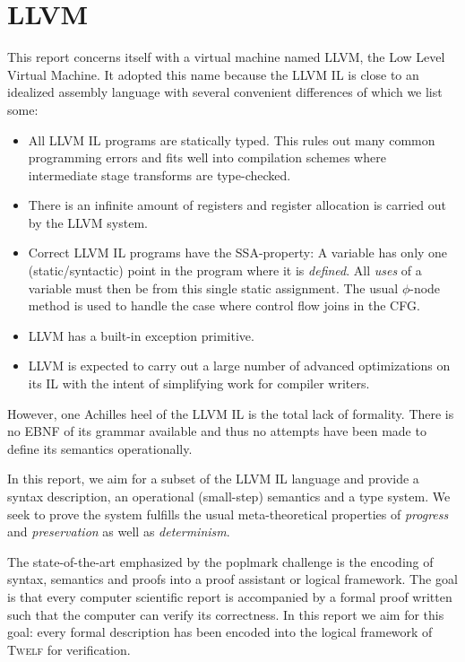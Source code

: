 \documentclass[a4paper, oneside, 10pt, draft]{memoir}
\newcommand{\twelf}{\textsc{Twelf}}
\begin{document}
\section{LLVM}

This report concerns itself with a virtual machine named LLVM, the Low
Level Virtual Machine. It adopted this name because the LLVM IL is
close to an idealized assembly language with several convenient
differences of which we list some:
\begin{itemize}
\item All LLVM IL programs are statically typed. This rules out many
  common programming errors and fits well into compilation schemes
  where intermediate stage transforms are type-checked.
\item There is an infinite amount of registers and register allocation
  is carried out by the LLVM system.
\item Correct LLVM IL programs have the SSA-property: A variable has
  only one (static/syntactic) point in the program where it is
  \emph{defined}. All \emph{uses} of a variable must then be from this
  single static assignment. The usual $\phi$-node method is used to
  handle the case where control flow joins in the CFG.
\item LLVM has a built-in exception primitive.
\item LLVM is expected to carry out a large number of advanced
  optimizations on its IL with the intent of simplifying work for
  compiler writers.
\end{itemize}

However, one Achilles heel of the LLVM IL is the total lack of
formality. There is no EBNF of its grammar available and thus no
attempts have been made to define its semantics operationally.

In this report, we aim for a subset of the LLVM IL language and
provide a syntax description, an operational (small-step) semantics and a type
system. We seek to prove the system fulfills the usual meta-theoretical
properties of \emph{progress} and \emph{preservation} as well as
\emph{determinism}.

The state-of-the-art emphasized by the poplmark
challenge\cite{aydemir:2005:mechanizedmetatheory} is the encoding of
syntax, semantics and proofs into a proof assistant or logical
framework. The goal is that every computer scientific report is
accompanied by a formal proof written such that the computer can
verify its correctness. In this report we aim for this goal: every
formal description has been encoded into the logical framework of
\twelf{}\cite{schurmann.pfenning:twelf} for verification.
\end{document}
